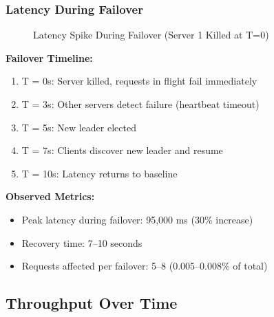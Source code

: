 \documentclass[12pt,a4paper]{article}
\begin{document}
\subsubsection{Latency During Failover}

\begin{figure}[h]
\centering
{}
\caption{Latency Spike During Failover (Server 1 Killed at T=0)}
\label{fig:failover-latency}
\end{figure}

\textbf{Failover Timeline:}
\begin{enumerate}
    \item T = 0s: Server killed, requests in flight fail immediately
    \item T = 3s: Other servers detect failure (heartbeat timeout)
    \item T = 5s: New leader elected
    \item T = 7s: Clients discover new leader and resume
    \item T = 10s: Latency returns to baseline
\end{enumerate}

\textbf{Observed Metrics:}
\begin{itemize}
    \item Peak latency during failover: 95,000 ms (30\% increase)
    \item Recovery time: 7--10 seconds
    \item Requests affected per failover: 5--8 (0.005--0.008\% of total)
\end{itemize}

\subsection{Throughput Over Time}
\end{document}
